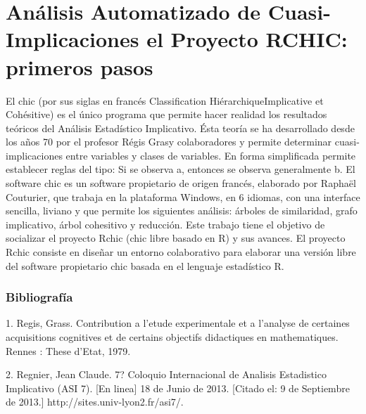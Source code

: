 \chapter{Análisis Automatizado de Cuasi-Implicaciones el Proyecto RCHIC: primeros pasos}




El chic (por sus siglas en francés Classification HiérarchiqueImplicative et Cohésitive) es el único programa que permite hacer realidad los resultados teóricos del Análisis Estadístico Implicativo. Ésta teoría se ha desarrollado desde los años 70 por el profesor Régis Grasy colaboradores y permite determinar cuasi-implicaciones entre variables y clases de variables. En forma simplificada permite establecer reglas del tipo: Si se observa a, entonces se observa generalmente b. El software chic es un software propietario de origen francés, elaborado por Raphaël Couturier, que trabaja en la plataforma Windows, en 6 idiomas, con una interface sencilla, liviano y que permite los siguientes análisis: árboles de similaridad, grafo implicativo, árbol cohesitivo y reducción. Este trabajo tiene el objetivo de socializar el proyecto Rchic (chic libre basado en R) y sus avances. El proyecto Rchic consiste en diseñar un entorno colaborativo para elaborar una versión libre del software propietario chic basada en el lenguaje estadístico R. \bigskip\subsection*{Bibliografía}

 1. Regis, Grass. Contribution a l'etude experimentale et a l'analyse de certaines acquisitions cognitives et de certains objectifs didactiques en mathematiques. Rennes : These d'Etat, 1979.

2. Regnier, Jean Claude. 7? Coloquio Internacional de Analisis Estadistico Implicativo (ASI 7). [En linea] 18 de Junio de 2013. [Citado el: 9 de Septiembre de 2013.] http://sites.univ-lyon2.fr/asi7/.

